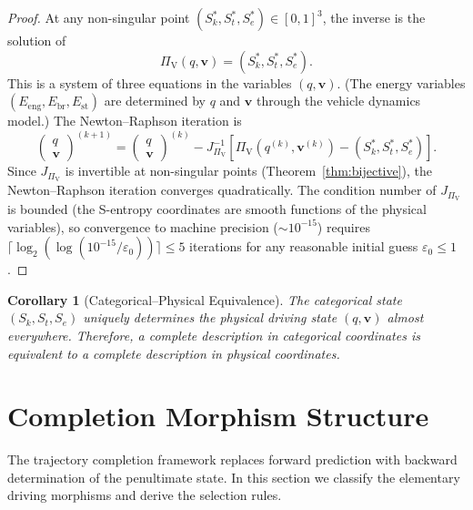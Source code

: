 \documentclass[twocolumn,10pt]{article}
\newtheorem{corollary}[theorem]{Corollary}
\newcommand{\PiV}{\Pi_{\mathrm{V}}}
\newcommand{\Sk}{S_k}
\newcommand{\St}{S_t}
\newcommand{\Se}{S_e}
\begin{document}
\begin{proof}
At any non-singular point $(\Sk^*, \St^*, \Se^*) \in [0,1]^3$, the inverse is the solution of
\begin{equation}
\PiV(q, \mathbf{v}) = (\Sk^*, \St^*, \Se^*).
\end{equation}
This is a system of three equations in the variables $(q, \mathbf{v})$. (The energy variables $(E_{\mathrm{eng}}, E_{\mathrm{br}}, E_{\mathrm{st}})$ are determined by $q$ and $\mathbf{v}$ through the vehicle dynamics model.) The Newton--Raphson iteration is
\begin{equation}
\begin{pmatrix} q \\ \mathbf{v} \end{pmatrix}^{(k+1)} = \begin{pmatrix} q \\ \mathbf{v} \end{pmatrix}^{(k)} - J_{\PiV}^{-1} \left[\PiV(q^{(k)}, \mathbf{v}^{(k)}) - (\Sk^*, \St^*, \Se^*)\right].
\end{equation}
Since $J_{\PiV}$ is invertible at non-singular points (Theorem~\ref{thm:bijective}), the Newton--Raphson iteration converges quadratically. The condition number of $J_{\PiV}$ is bounded (the S-entropy coordinates are smooth functions of the physical variables), so convergence to machine precision ($\sim 10^{-15}$) requires $\lceil \log_2(\log(10^{-15}/\varepsilon_0)) \rceil \leq 5$ iterations for any reasonable initial guess $\varepsilon_0 \leq 1$.
\end{proof}

\begin{corollary}[Categorical--Physical Equivalence]\label{cor:equivalence}
The categorical state $(\Sk, \St, \Se)$ uniquely determines the physical driving state $(q, \mathbf{v})$ almost everywhere. Therefore, a complete description in categorical coordinates is equivalent to a complete description in physical coordinates.
\end{corollary}


\section{Completion Morphism Structure}\label{sec:morphism}

The trajectory completion framework replaces forward prediction with backward determination of the penultimate state. In this section we classify the elementary driving morphisms and derive the selection rules.
\end{document}
